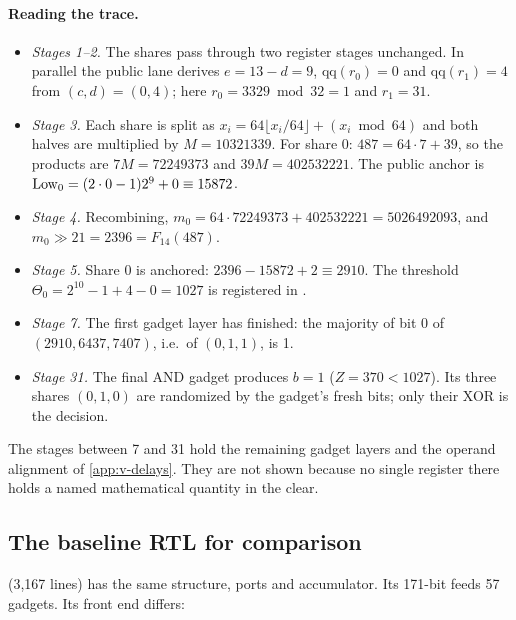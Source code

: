\paragraph{Reading the trace.}
\begin{itemize}
  \item \emph{Stages 1--2.} The shares pass through two register stages unchanged. In parallel the public lane derives $e = 13 - d = 9$, $\mathrm{qq}(r_0) = 0$ and $\mathrm{qq}(r_1) = 4$ from $(c, d) = (0, 4)$; here $r_0 = 3329 \bmod 32 = 1$ and $r_1 = 31$.
  \item \emph{Stage 3.} Each share is split as $x_i = 64 \lfloor x_i/64 \rfloor + (x_i \bmod 64)$ and both halves are multiplied by $M = 10321339$. For share 0: $487 = 64 \cdot 7 + 39$, so the products are $7M = 72249373$ and $39M = 402532221$. The public anchor is $\mathrm{Low}_0 = (2 \cdot 0 - 1) 2^9 + 0 \equiv 15872$.
  \item \emph{Stage 4.} Recombining, $m_0 = 64 \cdot 72249373 + 402532221 = 5026492093$, and $m_0 \gg 21 = 2396 = F_{14}(487)$.
  \item \emph{Stage 5.} Share 0 is anchored: $2396 - 15872 + 2 \equiv 2910$. The threshold $\Theta_0 = 2^{10} - 1 + 4 - 0 = 1027$ is registered in .
  \item \emph{Stage 7.} The first gadget layer has finished: the majority of bit 0 of $(2910, 6437, 7407)$, i.e.\ of $(0, 1, 1)$, is 1.
  \item \emph{Stage 31.} The final AND gadget produces $b = 1$ ($Z = 370 < 1027$). Its three shares $(0, 1, 0)$ are randomized by the gadget's fresh bits; only their XOR is the decision.
\end{itemize}
The stages between 7 and 31 hold the remaining gadget layers and the operand alignment of \cref{app:v-delays}. They are not shown because no single register there holds a named mathematical quantity in the clear.

\subsection{The baseline RTL for comparison}\label{app:v-base}
 (3,167 lines) has the same structure, ports and accumulator. Its 171-bit  feeds 57 gadgets. Its front end differs:

